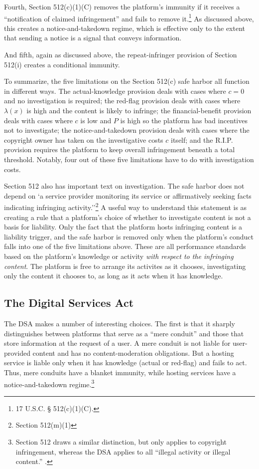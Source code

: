 Fourth, Section 512(c)(1)(C) removes the platform's immunity if it receives a ``notification of claimed infringement'' and fails to remove it.\footnote{17 U.S.C. § 512(c)(1)(C).} As discussed above, this creates a notice-and-takedown regime, which is effective only to the extent that sending a notice is a signal that conveys information.

And fifth, again as discussed above, the repeat-infringer provision of Section 512(i) creates a conditional immunity.

To summarize, the five limitations on the Section 512(c) safe harbor all function in different ways. The actual-knowledge provision deals with cases where $c = 0$ and no investigation is required; the red-flag provision deals with cases where $\lambda(x)$ is high and the content is likely to infringe; the financial-benefit provision deals with cases where $c$ is low and $P$ is high so the platform has bad incentives not to investigate; the notice-and-takedown provision deals with cases where the copyright owner has taken on the investigative costs $c$ itself; and the R.I.P. provision requires the platform to keep overall infringement beneath a total threshold. Notably, four out of these five limitations have to do with investigation costs.

Section 512 also has important text on investigation. The safe harbor does not depend on `a service provider monitoring its service or affirmatively seeking facts indicating infringing activity.''\footnote{Section 512(m)(1)} A useful way to understand this statement is as creating a rule that a platform's choice of whether to investigate content is not a basis for liability. Only the fact that the platform hosts infringing content is a liability trigger, and the safe harbor is removed only when the platform's conduct falls into  one of the five limitations above. These are all performance standards based on the platform's knowledge or activity \emph{with respect to the infringing content}. The platform is free to arrange its activites as it chooses, investigating only the content it chooses to, as long as it acts when it has knowledge.

\subsection{The Digital Services Act}

The DSA makes a number of interesting choices. The first is that it sharply distinguishes between platforms that serve as a ``mere conduit'' and those that store information at the request of a user. A mere conduit is not liable for user-provided content and has no content-moderation obligations. But a hosting service is liable only when it has knowledge (actual or red-flag) and fails to act. Thus, mere conduits have a blanket immunity, while hosting services have a notice-and-takedown regime.\footnote{Section 512 draws a similar distinction, but only applies to copyright infringement, whereas the DSA applies to all ``illegal activity or illegal content.'' .}


